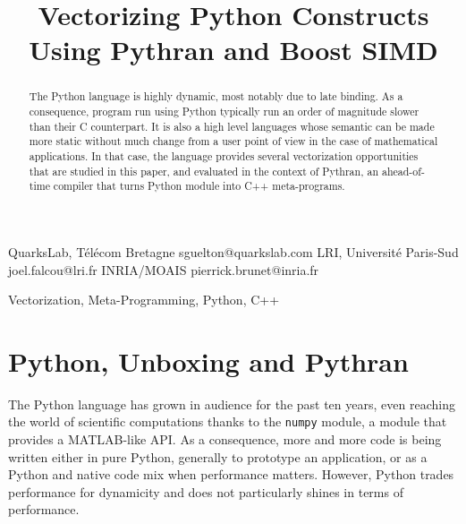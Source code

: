 \documentclass[preprint]{sigplanconf}
\begin{document}
\setlength{\pdfpageheight}{\paperheight}
\setlength{\pdfpagewidth}{\paperwidth}


\title{Vectorizing Python Constructs Using Pythran and Boost SIMD}

           {QuarksLab, T{\'e}l{\'e}com Bretagne}
           {sguelton@quarkslab.com}
           {LRI, Universit\'e Paris-Sud}
           {joel.falcou@lri.fr}
           {INRIA/MOAIS}
           {pierrick.brunet@inria.fr}

\maketitle

\begin{abstract}

    The Python language is highly dynamic, most notably due to late binding. As
    a consequence, program run using Python typically run an order of magnitude
    slower than their C counterpart. It is also a high level languages whose
    semantic can be made more static without much change from a user point of
    view in the case of mathematical applications. In that case, the language
    provides several vectorization opportunities that are studied in this
    paper, and evaluated in the context of Pythran, an ahead-of-time compiler
    that turns Python module into C++ meta-programs.

\end{abstract}



\keywords
Vectorization, Meta-Programming, Python, C++


\section{Python, Unboxing and Pythran}

The Python language has grown in audience for the past ten years, even reaching
the world of scientific computations thanks to the \texttt{numpy} module, a
module that provides a MATLAB-like API. As a consequence, more and more code is
being written either in pure Python, generally to prototype an application, or
as a Python and native code mix when performance matters. However, Python
trades performance for dynamicity and does not particularly shines in terms of
performance.
\end{document}
